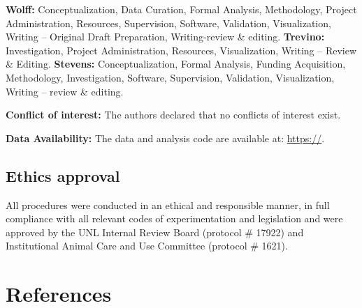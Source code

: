 \documentclass[
  ,doc,floatsintext]{apa6}
\begin{document}
\textbf{Wolff:} Conceptualization, Data Curation, Formal Analysis, Methodology, Project Administration, Resources, Supervision, Software, Validation, Visualization, Writing -- Original Draft Preparation, Writing-review \& editing. \textbf{Trevino:} Investigation, Project Administration, Resources, Visualization, Writing -- Review \& Editing. \textbf{Stevens:} Conceptualization, Formal Analysis, Funding Acquisition, Methodology, Investigation, Software, Supervision, Validation, Visualization, Writing -- review \& editing.

\textbf{Conflict of interest:} The authors declared that no conflicts of interest exist.

\textbf{Data Availability:} The data and analysis code are available at: \url{https://}.

\hypertarget{ethics-approval}{%
\subsection{Ethics approval}\label{ethics-approval}}

All procedures were conducted in an ethical and responsible manner, in full compliance with all relevant codes of experimentation and legislation and were approved by the UNL Internal Review Board (protocol \# 17922) and Institutional Animal Care and Use Committee (protocol \# 1621).

\newpage

\hypertarget{references}{%
\section{References}\label{references}}
\end{document}
